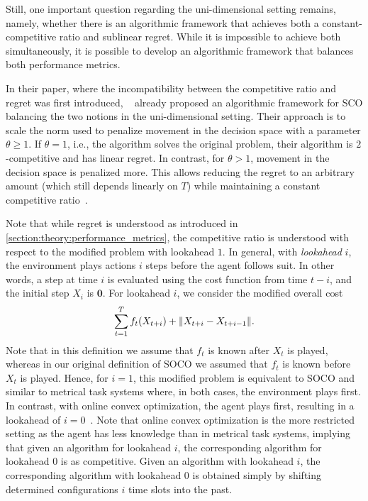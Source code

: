 Still, one important question regarding the uni-dimensional setting remains, namely, whether there is an algorithmic framework that achieves both a constant-competitive ratio and sublinear regret. While it is impossible to achieve both simultaneously, it is possible to develop an algorithmic framework that balances both performance metrics.

In their paper, where the incompatibility between the competitive ratio and regret was first introduced, \citeauthor{Andrew2015}~\cite{Andrew2015} already proposed an algorithmic framework for SCO balancing the two notions in the uni-dimensional setting. Their approach is to scale the norm used to penalize movement in the decision space with a parameter $\theta \geq 1$. If $\theta = 1$, i.e., the algorithm solves the original problem, their algorithm is $2$-competitive and has linear regret. In contrast, for $\theta > 1$, movement in the decision space is penalized more. This allows reducing the regret to an arbitrary amount (which still depends linearly on $T$) while maintaining a constant competitive ratio~\cite{Andrew2015}.

Note that while regret is understood as introduced in \cref{section:theory:performance_metrics}, the competitive ratio is understood with respect to the modified problem with lookahead $1$. In general, with \emph{lookahead} $i$, the environment plays actions $i$ steps before the agent follows suit. In other words, a step at time $i$ is evaluated using the cost function from time $t-i$, and the initial step $X_i$ is $\mathbf{0}$. For lookahead $i$, we consider the modified overall cost \begin{align*}
    \sum_{t=1}^T f_t(X_{t+i}) + \lVert X_{t+i} - X_{t+i-1}\rVert.
\end{align*} Note that in this definition we assume that $f_t$ is known after $X_t$ is played, whereas in our original definition of SOCO we assumed that $f_t$ is known before $X_t$ is played. Hence, for $i=1$, this modified problem is equivalent to SOCO and similar to metrical task systems where, in both cases, the environment plays first. In contrast, with online convex optimization, the agent plays first, resulting in a lookahead of $i=0$~\cite{Andrew2015}. Note that online convex optimization is the more restricted setting as the agent has less knowledge than in metrical task systems, implying that given an algorithm for lookahead $i$, the corresponding algorithm for lookahead $0$ is as competitive. Given an algorithm with lookahead $i$, the corresponding algorithm with lookahead $0$ is obtained simply by shifting determined configurations $i$ time slots into the past.

